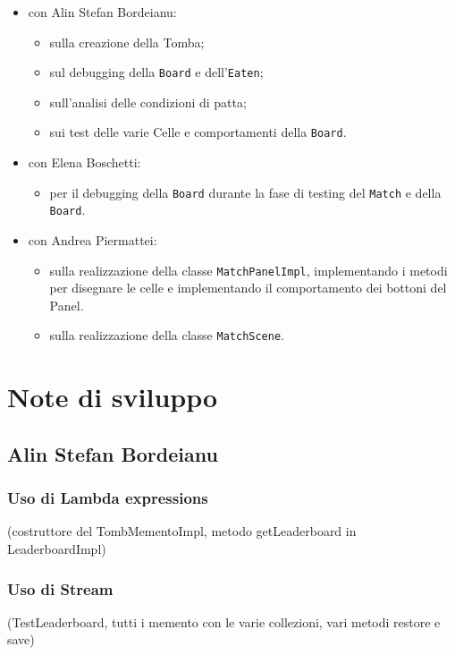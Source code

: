 \documentclass[a4paper,12pt]{report}
\begin{document}
\begin{itemize}
	\item con  Alin Stefan Bordeianu:
		\begin{itemize}
			\item sulla creazione della Tomba;
			\item sul debugging della \texttt{Board} e dell'\texttt{Eaten};
			\item sull'analisi delle condizioni di patta;
			\item sui test delle varie Celle e comportamenti della \texttt{Board}.
		\end{itemize}
	\item con Elena Boschetti:
		\begin{itemize}
			\item per il debugging della \texttt{Board} durante la fase di testing del \texttt{Match} e della \texttt{Board}.
		\end{itemize}
	\item con Andrea Piermattei:
		\begin{itemize}
			\item sulla realizzazione della classe \texttt{MatchPanelImpl}, implementando i metodi per disegnare le celle e implementando il comportamento dei bottoni del Panel.
			\item sulla realizzazione della classe \texttt{MatchScene}.
		\end{itemize}
\end{itemize}

\section{Note di sviluppo}

\subsection{Alin Stefan Bordeianu}

\subsubsection{Uso di Lambda expressions}
(costruttore del TombMementoImpl, metodo getLeaderboard in LeaderboardImpl)

\subsubsection{Uso di Stream}
(TestLeaderboard, tutti i memento con le varie collezioni, vari metodi restore e save)
\end{document}
